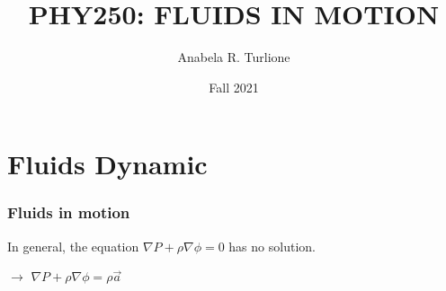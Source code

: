 \documentclass[]{beamer}
\title{PHY250: FLUIDS IN MOTION}    %
\author{Anabela R. Turlione}                 %
\institute{Digipen}      %
\date{Fall 2021}                    %
\begin{document}
\begin{frame}
  \titlepage
\end{frame}

\section[]{}

\begin{frame}
  \tableofcontents
\end{frame}







\section{Fluids Dynamic}

\begin{frame}
  \frametitle{Fluids in motion}


In general, the equation $\nabla P+\rho \nabla \phi =0$  has no solution.
\vspace{5mm}
\pause


\begin{center}
  $\rightarrow$ $\nabla P+\rho \nabla \phi =\rho \vec{a}$

\vspace{10mm}

  \textcolor{mypink1}{  }
\end{center}

  \end{frame}

\end{document}
